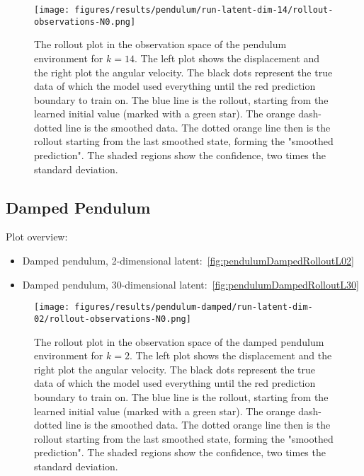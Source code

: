 		\begin{figure}
			\centering
			\texttt{[image: figures/results/pendulum/run-latent-dim-14/rollout-observations-N0.png]}
			\caption[Rollout of the pendulum experiment for 14 latent dimensions]{The rollout plot in the observation space of the pendulum environment for \(k = 14\). The left plot shows the displacement and the right plot the angular velocity. The black dots represent the true data of which the model used everything until the red prediction boundary to train on. The blue line is the rollout, starting from the learned initial value (marked with a green star). The orange dash-dotted line is the smoothed data. The dotted orange line then is the rollout starting from the last smoothed state, forming the "smoothed prediction". The shaded regions show the confidence, \ie two times the standard deviation.}
			\label{fig:pendulumRolloutL14}
		\end{figure}

	\subsection{Damped Pendulum}
		Plot overview:
		\begin{itemize}
			\item Damped pendulum, 2-dimensional latent:~\autoref{fig:pendulumDampedRolloutL02}
			\item Damped pendulum, 30-dimensional latent:~\autoref{fig:pendulumDampedRolloutL30}
		\end{itemize}

		\begin{figure}
			\centering
			\texttt{[image: figures/results/pendulum-damped/run-latent-dim-02/rollout-observations-N0.png]}
			\caption[Rollout of the damped pendulum experiment for 2 latent dimensions]{The rollout plot in the observation space of the damped pendulum environment for \(k = 2\). The left plot shows the displacement and the right plot the angular velocity. The black dots represent the true data of which the model used everything until the red prediction boundary to train on. The blue line is the rollout, starting from the learned initial value (marked with a green star). The orange dash-dotted line is the smoothed data. The dotted orange line then is the rollout starting from the last smoothed state, forming the "smoothed prediction". The shaded regions show the confidence, \ie two times the standard deviation.}
			\label{fig:pendulumDampedRolloutL02}
		\end{figure}

